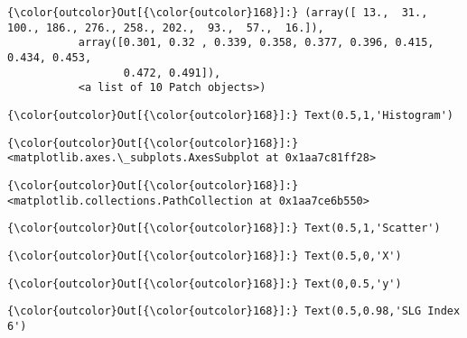 \documentclass[11pt]{article}
\begin{document}
\begin{Verbatim}[commandchars=\\\{\}]
{\color{outcolor}Out[{\color{outcolor}168}]:} (array([ 13.,  31., 100., 186., 276., 258., 202.,  93.,  57.,  16.]),
           array([0.301, 0.32 , 0.339, 0.358, 0.377, 0.396, 0.415, 0.434, 0.453,
                  0.472, 0.491]),
           <a list of 10 Patch objects>)
\end{Verbatim}
            
\begin{Verbatim}[commandchars=\\\{\}]
{\color{outcolor}Out[{\color{outcolor}168}]:} Text(0.5,1,'Histogram')
\end{Verbatim}
            
\begin{Verbatim}[commandchars=\\\{\}]
{\color{outcolor}Out[{\color{outcolor}168}]:} <matplotlib.axes.\_subplots.AxesSubplot at 0x1aa7c81ff28>
\end{Verbatim}
            
\begin{Verbatim}[commandchars=\\\{\}]
{\color{outcolor}Out[{\color{outcolor}168}]:} <matplotlib.collections.PathCollection at 0x1aa7ce6b550>
\end{Verbatim}
            
\begin{Verbatim}[commandchars=\\\{\}]
{\color{outcolor}Out[{\color{outcolor}168}]:} Text(0.5,1,'Scatter')
\end{Verbatim}
            
\begin{Verbatim}[commandchars=\\\{\}]
{\color{outcolor}Out[{\color{outcolor}168}]:} Text(0.5,0,'X')
\end{Verbatim}
            
\begin{Verbatim}[commandchars=\\\{\}]
{\color{outcolor}Out[{\color{outcolor}168}]:} Text(0,0.5,'y')
\end{Verbatim}
            
\begin{Verbatim}[commandchars=\\\{\}]
{\color{outcolor}Out[{\color{outcolor}168}]:} Text(0.5,0.98,'SLG Index 6')
\end{Verbatim}
            
\end{document}
